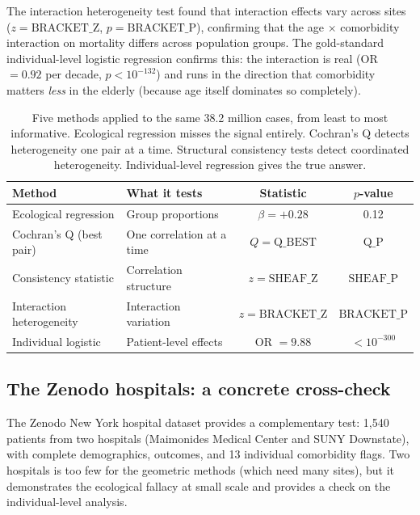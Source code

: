 \documentclass{article}
\begin{document}
The interaction heterogeneity test found that interaction effects vary across
sites ($z = \text{BRACKET\_Z}$, $p = \text{BRACKET\_P}$), confirming that the
age $\times$ comorbidity interaction on mortality differs across population
groups.  The gold-standard individual-level logistic regression confirms this:
the interaction is real (OR $= 0.92$ per decade, $p < 10^{-132}$) and runs
in the direction that comorbidity matters \emph{less} in the elderly (because
age itself dominates so completely).

\begin{table}[t]
\centering
\caption{Five methods applied to the same 38.2 million cases, from least to
most informative.  Ecological regression misses the signal entirely.
Cochran's Q detects heterogeneity one pair at a time.  Structural consistency
tests detect coordinated heterogeneity.  Individual-level regression gives the
true answer.}
\label{tab:comparison}
\begin{tabular}{llcc}
\toprule
Method & What it tests & Statistic & $p$-value \\
\midrule
Ecological regression & Group proportions & $\beta = +0.28$ & 0.12 \\
Cochran's Q (best pair) & One correlation at a time & $Q = \text{Q\_BEST}$ & $\text{Q\_P}$ \\
Consistency statistic & Correlation structure & $z = \text{SHEAF\_Z}$ & $\text{SHEAF\_P}$ \\
Interaction heterogeneity & Interaction variation & $z = \text{BRACKET\_Z}$ & $\text{BRACKET\_P}$ \\
Individual logistic & Patient-level effects & OR $= 9.88$ & $< 10^{-300}$ \\
\bottomrule
\end{tabular}
\end{table}


\subsection{The Zenodo hospitals: a concrete cross-check}

The Zenodo New York hospital dataset provides a complementary test: 1,540
patients from two hospitals (Maimonides Medical Center and SUNY Downstate),
with complete demographics, outcomes, and 13 individual comorbidity flags.
Two hospitals is too few for the geometric methods (which need many sites), but
it demonstrates the ecological fallacy at small scale and provides a check on
the individual-level analysis.
\end{document}
